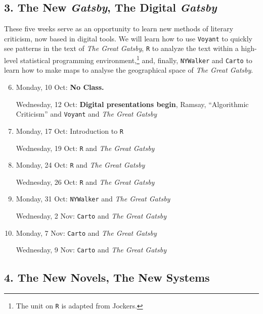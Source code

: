 \subsection*{3. The New \textit{Gatsby}, The Digital \textit{Gatsby}}

  These five weeks serve as an opportunity to learn new methods of literary
  criticism, now based in digital tools. We will learn how to use
  \texttt{Voyant} to quickly see patterns in the text of \textit{The Great
    Gatsby}, \texttt{R} to analyze the text within a high-level statistical
  programming environment,\footnote{The unit on \texttt{R} is adapted from
    Jockers.} and, finally, \texttt{NYWalker} and \texttt{Carto} to learn how
  to make maps to analyse the geographical space of \textit{The Great Gatsby}.

\begin{enumerate}
  \setcounter{enumi}{5}
 
  \item Monday, 10 Oct: \textbf{No Class.}

    Wednesday, 12 Oct: \textbf{\small Digital presentations begin}, Ramsay,
    “Algorithmic Criticism” and \texttt{Voyant} and \textit{The Great Gatsby}
  
  \item Monday, 17 Oct: Introduction to \texttt{R}

    Wednesday, 19 Oct: \texttt{R} and \textit{The Great Gatsby}

  \item Monday, 24 Oct: \texttt{R} and \textit{The Great Gatsby}

    Wednesday,  26 Oct: \texttt{R} and \textit{The Great Gatsby}

  \item Monday, 31 Oct: \texttt{NYWalker} and \textit{The Great Gatsby}

    Wednesday, 2 Nov: \texttt{Carto} and \textit{The Great Gatsby}

  \item Monday, 7 Nov: \texttt{Carto} and \textit{The Great Gatsby}

    Wednesday, 9 Nov: \texttt{Carto} and \textit{The Great Gatsby}

\end{enumerate}

\subsection*{4. The New Novels, The New Systems}

